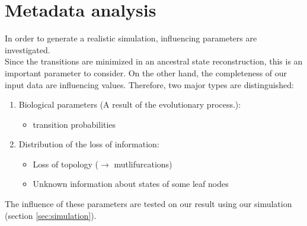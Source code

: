   \section{Metadata analysis}
    In order to generate a realistic simulation, influencing parameters are investigated. \\
    Since the transitions are minimized in an ancestral state reconstruction, this is an important 
      parameter to consider. On the other hand, the completeness of our input data are influencing 
      values. Therefore, two major types are distinguished:
    \begin{enumerate}
      \item Biological parameters (A result of the evolutionary process.):
        \begin{itemize}
          \item transition probabilities
        \end{itemize}
      \item Distribution of the loss of information:
        \begin{itemize}
          \item Loss of topology ($\rightarrow$ mutlifurcations)
          \item Unknown information about states of some leaf nodes
        \end{itemize}
    \end{enumerate}
    The influence of these parameters are tested on our result using our simulation (section 
      \ref{sec:simulation}).
   
